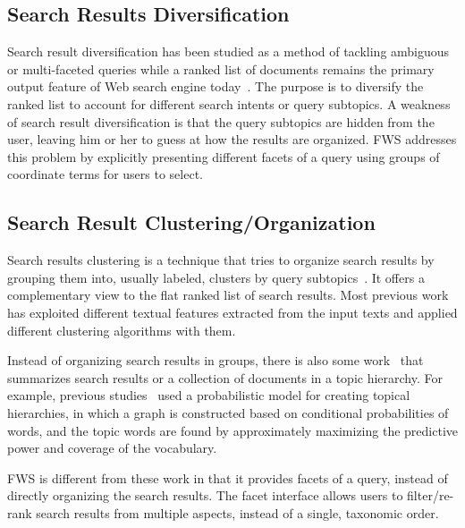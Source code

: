 \subsection{Search Results Diversification}
Search result diversification has been studied as a method of tackling ambiguous or multi-faceted queries while a ranked list of documents remains the primary output feature of Web search engine today~\cite{agrawal2009diversifying,clarke2008novelty,santos2010exploiting,sakai2011evaluating,dang2013term}.
The purpose is to diversify the ranked list to account for different search intents or query subtopics.
A weakness of search result diversification is that the query subtopics are hidden from the user, leaving him or her to guess at how the results are organized.
FWS addresses this problem by explicitly presenting different facets of a query using groups of coordinate terms for users to select.

\subsection{Search Result Clustering/Organization}
Search results clustering is a technique that tries to organize search results by grouping them into, usually labeled, clusters by query subtopics~\cite{carpineto2009survey}.
It offers a complementary view to the flat ranked list of search results.
Most previous work has exploited different textual features extracted from the input texts and applied different clustering algorithms with them.

Instead of organizing search results in groups, there is also some work~\cite{lawrie2001finding,lawrie2003generating, nevill1999lexically} that summarizes search results or a collection of documents in a topic hierarchy. For example, previous studies~\cite{lawrie2001finding,lawrie2003generating} used a probabilistic model for creating topical hierarchies, in which a graph is constructed based on conditional probabilities of words, and the topic words are found by approximately maximizing the predictive power and coverage of the vocabulary. 

FWS is different from these work in that it provides facets of a query, instead of directly organizing the search results. The facet interface allows users to filter/re-rank search results from multiple aspects, instead of a single, taxonomic order.

